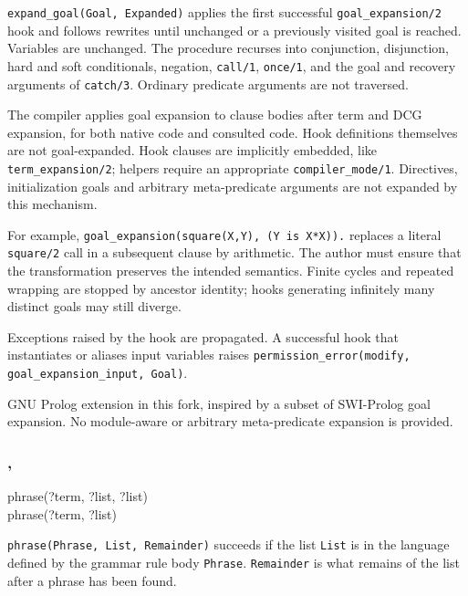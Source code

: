 \Description

\texttt{expand\_goal(Goal, Expanded)} applies the first successful
\texttt{goal\_expansion/2} hook and follows rewrites until unchanged or a
previously visited goal is reached. Variables are unchanged. The procedure
recurses into conjunction, disjunction, hard and soft conditionals, negation,
\texttt{call/1}, \texttt{once/1}, and the goal and recovery arguments of
\texttt{catch/3}. Ordinary predicate arguments are not traversed.

The compiler applies goal expansion to clause bodies after term and DCG
expansion, for both native code and consulted code. Hook definitions themselves
are not goal-expanded. Hook clauses are implicitly embedded, like
\texttt{term\_expansion/2}; helpers require an appropriate
\texttt{compiler\_mode/1}. Directives, initialization goals and arbitrary
meta-predicate arguments are not expanded by this mechanism.

For example, \texttt{goal\_expansion(square(X,Y), (Y is X*X)).} replaces
a literal \texttt{square/2} call in a subsequent clause by arithmetic.
The author must ensure that the transformation preserves the intended semantics.
Finite cycles and repeated wrapping are stopped by ancestor identity; hooks
generating infinitely many distinct goals may still diverge.

\Errors

Exceptions raised by the hook are propagated. A successful hook that
instantiates or aliases input variables raises
\texttt{permission\_error(modify, goal\_expansion\_input, Goal)}.

\Portability

GNU Prolog extension in this fork, inspired by a subset of SWI-Prolog goal
expansion. No module-aware or arbitrary meta-predicate expansion is provided.

\subsubsection{,
               }

\begin{TemplatesOneCol}
phrase(?term, ?list, ?list)\\
phrase(?term, ?list)

\end{TemplatesOneCol}

\Description

\texttt{phrase(Phrase, List, Remainder)} succeeds if the list
\texttt{List} is in the language defined by the grammar rule body
\texttt{Phrase}. \texttt{Remainder} is what remains of the list after a
phrase has been found.

